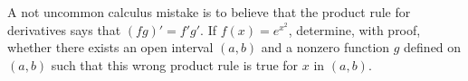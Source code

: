 A not uncommon calculus mistake is to believe that the product rule
for derivatives says that $(fg)' = f'g'$. If $f(x)=e^{x^2}$,
determine, with proof, whether there exists an open interval $(a,b)$
and a nonzero function $g$ defined on $(a,b)$ such that this wrong
product rule is true for $x$ in $(a,b)$.
